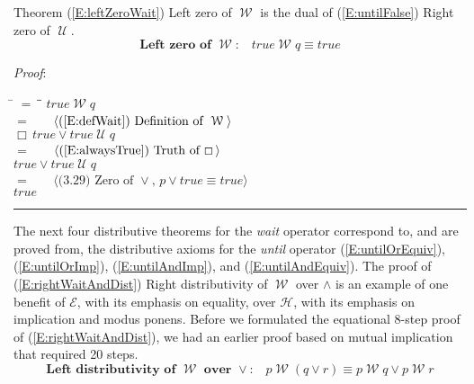 \documentclass[12pt, fleqn, leqno]{article}
\newcommand{\lgap}{2pt}                             %
\newcommand{\mymathindent}{24pt}                    %
\newcommand{\Until}{\;\mathcal{U}\;}
\newcommand{\Wait}{\;\mathcal{W}\;}
\newcommand{\Always}{\Box\,}
\newcommand{\myqed}{\rule[-.23ex]{1.2ex}{2.0ex}}
\newcommand{\myqedtab}{\hspace{384pt}}              %
\newcommand{\Gll} {\langle}                         %
\newcommand{\Ggg} {\rangle}                         %
\newcommand{\Hint}[1]     {\ \ \ $\Gll              \mbox{#1} \Ggg$ }   %
\begin{document}
Theorem (\ref{E:leftZeroWait}) Left zero of $\Wait$ is the dual of (\ref{E:untilFalse}) Right zero of $\Until$.
\begin{equation}\label{E:leftZeroWait}
\textbf{Left zero of $\Wait$:}\quad true \Wait q \equiv true
\end{equation}

\emph{Proof}:
\begin{tabbing}
\hspace{\mymathindent} \= $= \;$ \= \myqedtab \= \kill
\> \> $true \Wait q$\\[\lgap]
\> $=$ \> \Hint{(\ref{E:defWait}) Definition of $\Wait$} \\[\lgap]
\> \> $\Always true \lor true\Until q$\\[\lgap]
\> $=$ \> \Hint{(\ref{E:alwaysTrue}) Truth of $\Always$} \\[\lgap]
\> \> $true \lor true\Until q$\\[\lgap]
\> $=$ \> \Hint{(3.29) Zero of $\lor$, $p\lor true \equiv true$}\\[\lgap]
\> \> $true$ \quad \myqed
\end{tabbing}

The next four distributive theorems for the \textit{wait} operator correspond to, and are proved from,
the distributive axioms for the \textit{until} operator
(\ref{E:untilOrEquiv}), (\ref{E:untilOrImp}), (\ref{E:untilAndImp}), and (\ref{E:untilAndEquiv}).
The proof of (\ref{E:rightWaitAndDist}) Right distributivity of $\Wait$ over $\land$ is an example of one benefit of $\mathcal{E}$, with its emphasis on equality, over $\mathcal{H}$, with its emphasis on implication and modus ponens.
Before we formulated the equational 8-step proof of (\ref{E:rightWaitAndDist}), we had an earlier proof based on mutual implication that required 20 steps.
\begin{equation}\label{E:waitOrDist}
\textbf{Left distributivity of $\Wait$ over $\lor$:}\quad p \Wait (q \lor r) \equiv p \Wait q \lor p \Wait r
\end{equation}
\end{document}
